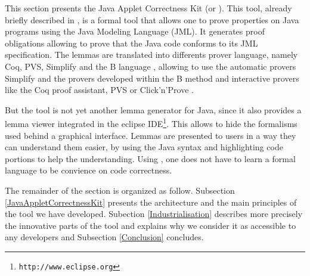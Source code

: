   This section presents the Java Applet Correctness Kit
 (or \JACK).  This tool, already briefly described in
 \cite{BR-gdc2002}, is a formal tool that allows one to prove properties on
 Java programs using the Java Modeling Language \cite{LBR00} (JML).
 It generates proof obligations
 allowing to prove that the Java code conforms to its JML
 specification.  The lemmas are translated into differents prover language, namely Coq, PVS, Simplify and the B language \cite{bbook},
 allowing to use the automatic provers Simplify and the provers developed within the B method and interactive provers like the Coq proof assistant, PVS or Click'n'Prove .

 But the tool is not yet another lemma generator for Java, since it also provides a lemma
 viewer integrated in the eclipse
 IDE\footnote{\texttt{http://www.eclipse.org}}.  This allows to
 hide the formalisms used behind a graphical interface.  Lemmas are
 presented to users in a way they can understand them easier, by using the Java syntax and highlighting code portions to help
 the understanding. Using \JACK, one does not have to learn a formal language to be convience on
code correctness.

 The remainder of the section is organized as follow.  Subsection \ref{JavaAppletCorrectnessKit} presents the
 architecture and the main principles of the tool we have
 developed. Subection \ref{Industrialisation} describes more precisely
 the innovative parts of the tool and explains why we consider it as
 accessible to any developers and Subsection \ref{Conclusion} concludes.
